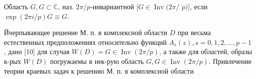 \documentclass[10pt]{article}
\begin{document}
Область $G, G \subset \mathbb{C}$, наз. $2 \pi / p$-инвариантной $[G \in \operatorname{Inv}(2 \pi /$ $p)]$, если $\exp (2 \pi i / p) G \equiv G$.



Йчерпывающее решение М. п. в комплексной области $D$ при весьма естественных предположениях относительно функций $A_{s}(z), s=0,1,2, \ldots, p-1$, дано [10] для случая $W(D)=G \in \operatorname{Inv}(2 \pi / p)$, а также для областей, образы к-рых $W(D)$ погружаемы в нек-рую область $G, G \in \operatorname{Inv}(2 \pi / p)$. Привлечение теории краевых задач к решению М. п. в комплексной области
\end{document}
